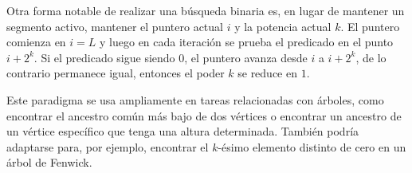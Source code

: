 Otra forma notable de realizar una búsqueda binaria es, en lugar de mantener un segmento activo, mantener el puntero actual $i$ y la potencia actual $k$. El puntero comienza en $i=L$ y luego en cada iteración se prueba el predicado en el punto $i+2^k$. Si el predicado sigue siendo $0$, el puntero avanza desde $i$ a $i+2^k$, de lo contrario permanece igual, entonces el poder $k$ se reduce en $1$.

Este paradigma se usa ampliamente en tareas relacionadas con árboles, como encontrar el ancestro común más bajo de dos vértices o encontrar un ancestro de un vértice específico que tenga una altura determinada. También podría adaptarse para, por ejemplo, encontrar el $k$-ésimo elemento distinto de cero en un árbol de Fenwick.